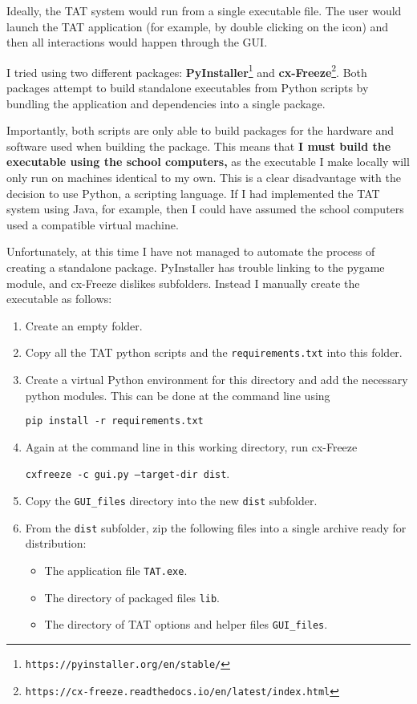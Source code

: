 \documentclass[10pt]{article}
\begin{document}
Ideally, the TAT system would run from a single executable file. The user would launch the TAT application (for example, by double clicking on the icon) and then all interactions would happen through the GUI. 

I tried using two different packages: \textbf{PyInstaller}\footnote{\texttt{https://pyinstaller.org/en/stable/}} and \textbf{cx-Freeze}\footnote{\texttt{https://cx-freeze.readthedocs.io/en/latest/index.html}}. Both packages attempt to build standalone executables from Python scripts by bundling the application and dependencies into a single package. 

Importantly, both scripts are only able to build packages for the hardware and software used when building the package. This means that \textbf{I must build the executable using the school computers,} as the executable I make locally will only run on machines identical to my own. This is a clear disadvantage with the decision to use Python, a scripting language. If I had implemented the TAT system using Java, for example, then I could have assumed the school computers used a compatible virtual machine.

Unfortunately, at this time I have not managed to automate the process of creating a standalone package. PyInstaller has trouble linking to the pygame module, and cx-Freeze dislikes subfolders. Instead I manually create the executable as follows:

\begin{enumerate}
\item Create an empty folder.
\item Copy all the TAT python scripts and the \texttt{requirements.txt} into this folder.
\item Create a virtual Python environment for this directory and add the necessary python modules. This can be done at the command line using

\texttt{pip install -r requirements.txt}

\item Again at the command line in this working directory, run cx-Freeze

\texttt{cxfreeze -c gui.py --target-dir dist}.

\item Copy the \texttt{GUI\_files} directory into the new \texttt{dist} subfolder.
\item From the \texttt{dist} subfolder, zip the following files into a single archive ready for distribution:
\begin{itemize}
\item The application file \texttt{TAT.exe}.
\item The directory of packaged files \texttt{lib}.
\item The directory of TAT options and helper files \texttt{GUI\_files}.
\end{itemize}
\end{enumerate}
\end{document}
